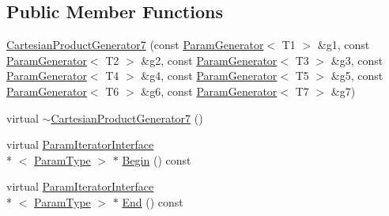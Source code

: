 \subsection*{Public Member Functions}
\begin{DoxyCompactItemize}
\item 
\hyperlink{classtesting_1_1internal_1_1_cartesian_product_generator7_aafc9c559223d3a685028ec98aa727818}{Cartesian\-Product\-Generator7} (const \hyperlink{classtesting_1_1internal_1_1_param_generator}{Param\-Generator}$<$ T1 $>$ \&g1, const \hyperlink{classtesting_1_1internal_1_1_param_generator}{Param\-Generator}$<$ T2 $>$ \&g2, const \hyperlink{classtesting_1_1internal_1_1_param_generator}{Param\-Generator}$<$ T3 $>$ \&g3, const \hyperlink{classtesting_1_1internal_1_1_param_generator}{Param\-Generator}$<$ T4 $>$ \&g4, const \hyperlink{classtesting_1_1internal_1_1_param_generator}{Param\-Generator}$<$ T5 $>$ \&g5, const \hyperlink{classtesting_1_1internal_1_1_param_generator}{Param\-Generator}$<$ T6 $>$ \&g6, const \hyperlink{classtesting_1_1internal_1_1_param_generator}{Param\-Generator}$<$ T7 $>$ \&g7)
\item 
virtual \hyperlink{classtesting_1_1internal_1_1_cartesian_product_generator7_a1efbaf80c9394e0626da229beb6b1084}{$\sim$\-Cartesian\-Product\-Generator7} ()
\item 
virtual \hyperlink{classtesting_1_1internal_1_1_param_iterator_interface}{Param\-Iterator\-Interface}\\*
$<$ \hyperlink{classtesting_1_1internal_1_1_cartesian_product_generator7_ac749b651dcf74699c59f548cd33e40c1}{Param\-Type} $>$ $\ast$ \hyperlink{classtesting_1_1internal_1_1_cartesian_product_generator7_a91166095533bc7aa2fb5cc198b3c831e}{Begin} () const 
\item 
virtual \hyperlink{classtesting_1_1internal_1_1_param_iterator_interface}{Param\-Iterator\-Interface}\\*
$<$ \hyperlink{classtesting_1_1internal_1_1_cartesian_product_generator7_ac749b651dcf74699c59f548cd33e40c1}{Param\-Type} $>$ $\ast$ \hyperlink{classtesting_1_1internal_1_1_cartesian_product_generator7_a3b5e8c49981d86e7691bf267b687a47a}{End} () const 
\end{DoxyCompactItemize}


